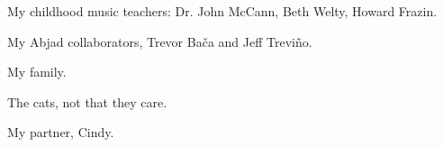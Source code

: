 

My childhood music teachers: Dr. John McCann, Beth Welty, Howard Frazin.

My Abjad collaborators, Trevor Ba\v{c}a and Jeff Trevi\~{n}o.

My family.

The cats, not that they care.

My partner, Cindy.